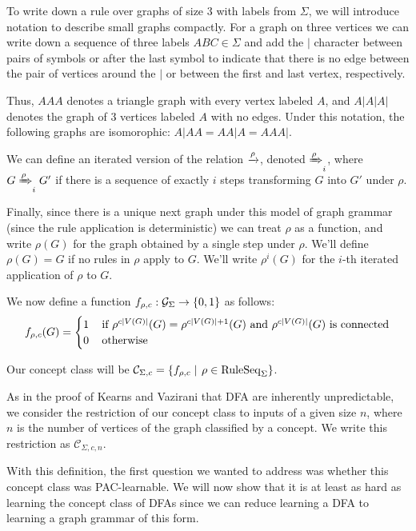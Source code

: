 \documentclass[]{article}
\def\RuleSeq{\mathrm{RuleSeq}\xspace}
\def\Graphs{\mathcal{G}\xspace}
\def\Concepts{\mathcal{C}\xspace}
\begin{document}
To write down a rule over graphs of size $3$ with labels from $\Sigma$, we will
introduce notation to describe small graphs compactly. For a graph on three
vertices we can write down a sequence of three labels $ABC \in \Sigma$ and add
the $|$ character between pairs of symbols or after the last symbol to indicate
that there is no edge between the pair of vertices around the $|$ or between the
first and last vertex, respectively.

Thus, $AAA$ denotes a triangle graph with every vertex labeled $A$, and $A|A|A|$
denotes the graph of 3 vertices labeled $A$ with no edges. Under this notation,
the following graphs are isomorophic: $A|AA = AA|A = AAA|$.

We can define an iterated version of the relation $\xrightarrow{\rho}$, denoted
$\xRightarrow{\rho}_i$, where $G \xRightarrow{\rho}_i G'$ if there is a sequence of exactly
$i$ steps transforming $G$ into $G'$ under $\rho$.

Finally, since there is a unique next graph under this model of graph grammar
(since the rule application is deterministic) we can treat $\rho$ as a function,
and write $\rho(G)$ for the graph obtained by a single step under $\rho$. We'll
define $\rho(G) =G$ if no rules in $\rho$ apply to $G$. We'll write $\rho^i(G)$
for the $i$-th iterated application of $\rho$ to $G$.

We now define a function $f_{\rho,c} : \Graphs_{\Sigma} \to \Set{0,1}$ as follows:
\[f_{\rho,c}(G) = \begin{cases}
    1 &\,\text{if $\rho^{c\left| V(G) \right|}(G) = \rho^{c\left| V(G) \right|+1}(G)$ and $\rho^{c\left| V(G) \right|}(G)$ is connected}\\
    0 &\,\text{otherwise}
  \end{cases}\]

Our concept class will be
\(\Concepts_{\Sigma,c} = \Setbar{f_{\rho,c}}{\rho\in \RuleSeq_\Sigma}\).

As in the proof of Kearns and Vazirani that DFA are inherently unpredictable, we
consider the restriction of our concept class to inputs of a given size $n$,
where $n$ is the number of vertices of the graph classified by a concept. We
write this restriction as $\Concepts_{\Sigma,c,n}$.

With this definition, the first question we wanted to address was whether this
concept class was PAC-learnable. We will now show that it is at least as
hard as learning the concept class of DFAs since we can reduce learning a DFA to
learning a graph grammar of this form.
\end{document}
